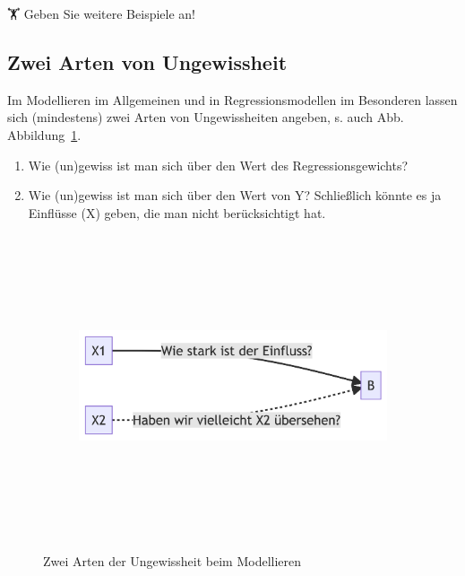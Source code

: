\documentclass[
  a4paper,
  DIV=11]{scrreprt}
\theoremstyle{definition}
\theoremstyle{remark}
\begin{document}
🏋 Geben Sie weitere Beispiele an!

\hypertarget{zwei-arten-von-ungewissheit}{%
\subsection{Zwei Arten von
Ungewissheit}\label{zwei-arten-von-ungewissheit}}

Im Modellieren im Allgemeinen und in Regressionsmodellen im Besonderen
lassen sich (mindestens) zwei Arten von Ungewissheiten angeben, s. auch
Abb. Abbildung~\ref{fig-zwei-arten}.

\begin{enumerate}
\def\labelenumi{\arabic{enumi}.}
\item
  Wie (un)gewiss ist man sich über den Wert des Regressionsgewichts?
\item
  Wie (un)gewiss ist man sich über den Wert von Y? Schließlich könnte es
  ja Einflüsse (X) geben, die man nicht berücksichtigt hat.
\end{enumerate}

\begin{figure}

{\centering 

\begin{figure}[H]

{\centering \includegraphics[width=5.5in,height=3.5in]{./Inferenz_files/figure-latex/mermaid-figure-2.png}

}

\end{figure}

}

\caption{\label{fig-zwei-arten}Zwei Arten der Ungewissheit beim
Modellieren}

\end{figure}
\end{document}
